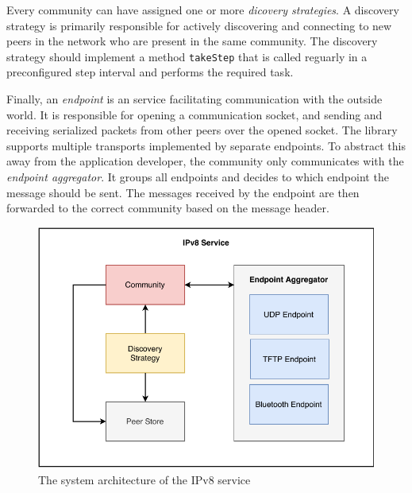 Every community can have assigned one or more \textit{dicovery strategies}. A discovery strategy is primarily responsible for actively discovering and connecting to new peers in the network who are present in the same community. The discovery strategy should implement a method \texttt{takeStep} that is called reguarly in a preconfigured step interval and performs the required task.


Finally, an \textit{endpoint} is an service facilitating communication with the outside world. It is responsible for opening a communication socket, and sending and receiving serialized packets from other peers over the opened socket. %
The library supports multiple transports implemented by separate endpoints. To abstract this away from the application developer, the community only communicates with the \textit{endpoint aggregator}. It groups all endpoints and decides to which endpoint the message should be sent. The messages received by the endpoint are then forwarded to the correct community based on the message header.

\begin{figure}
    \includegraphics[width=\textwidth]{diagrams/ipv8-architecture}
    \caption{The system architecture of the IPv8 service}
    \label{ipv8_architecture}
\end{figure}

